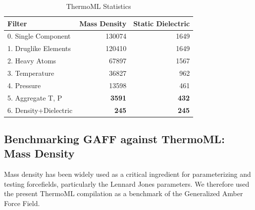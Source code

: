 \documentclass[journal=jacsat,manuscript=article]{achemso}
\begin{document}
\begin{table}
\begin{tabular}{lrr}
\toprule
Filter &  Mass Density &  Static Dielectric \\
\midrule
0.  Single Component   &               130074 &                                     1649 \\
1.  Druglike Elements  &               120410 &                                     1649 \\
2.  Heavy Atoms        &                67897 &                                     1567 \\
3.  Temperature        &                36827 &                                      962 \\
4.  Pressure           &                13598 &                                      461 \\
5.  Aggregate T, P     &            \bf{3591} &                                 \bf{432} \\
6.  Density+Dielectric &             \bf{245} &                                 \bf{245} \\
\bottomrule
\end{tabular}
\caption{ThermoML Statistics}
\label{table:ThermoMLSummary}
\end{table}


\subsection{Benchmarking GAFF against ThermoML: Mass Density}

Mass density has been widely used as a critical ingredient for parameterizing and testing forcefields, particularly the Lennard Jones parameters.  We therefore used the present ThermoML compilation as a benchmark of the Generalized Amber Force Field.  
\end{document}
